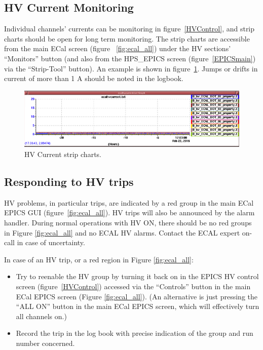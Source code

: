 \documentclass[12pt]{article}
\begin{document}
   \subsection{HV Current Monitoring}
   Individual channels' currents can be monitoring in figure~\ref{HVControl}, and strip charts should be open for long term monitoring.  The strip charts are accessible from the main ECal screen (figure ~\ref{fig:ecal_all}) under the HV sections' ``Monitors'' button (and also from the HPS\_EPICS screen (figure~\ref{EPICSmain}) via the ``Strip-Tool'' button).  An example is shown in figure~\ref{fig:hvcurrentstrips}.  Jumps or drifts in current of more than 1 A should be noted in the logbook.

   \begin{figure}[htbp]\centering
       \includegraphics[width=16cm]{pics/hvcurrentstrip.png}
       \caption{HV Current strip charts.\label{fig:hvcurrentstrips}}
   \end{figure}


   \subsection{Responding to HV trips}

   HV problems, in particular trips, are indicated by a red group in the main ECal EPICS GUI (figure~\ref{fig:ecal_all}).  HV trips will also be announced by the alarm handler.  During normal operations with HV ON, there should be no red groups in Figure \ref{fig:ecal_all} and no ECAL HV alarms.  Contact the ECAL expert on-call in case of uncertainty.
     
In case of an HV trip, or a red region in Figure \ref{fig:ecal_all}:
\begin{itemize}
    \item Try to reenable the HV group by turning it back on in the EPICS HV control screen (figure~\ref{HVControl}) accessed via the ``Controls'' button in the main ECal EPICS screen (Figure \ref{fig:ecal_all}).  (An alternative is just pressing the ``ALL ON'' button in the 
main ECal EPICS screen, which will effectively turn all channels on.)
    \item Record the trip in the log book with precise indication of the group and run
        number concerned. 
\end{itemize}
      
\end{document}
